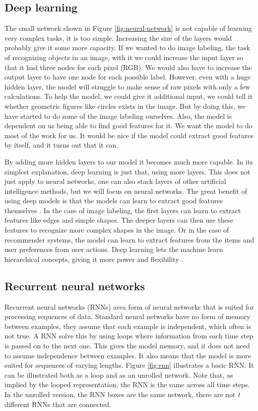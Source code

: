 \subsection{Deep learning}
The small network shown in Figure \ref{fig:neural-network} is not capable of learning very complex tasks, it is too simple.  Increasing the size of the layers would probably give it some more capacity. If we wanted to do image labeling, the task of recognizing objects in an image, with it we could increase the input layer so that it had three nodes for each pixel (RGB). We would also have to increase the output layer to have one node for each possible label. However, even with a huge hidden layer, the model will struggle to make sense of raw pixels with only a few calculations. To help the model, we could give it additional input, we could tell it whether geometric figures like circles exists in the image. But by doing this, we have started to do some of the image labeling ourselves. Also, the model is dependent on us being able to find good features for it. We want the model to do most of the work for us. It would be nice if the model could extract good features by itself, and it turns out that it can.

By adding more hidden layers to our model it becomes much more capable. In its simplest explanation, deep learning is just that, using more layers. This does not just apply to neural networks, one can also stack layers of other artificial intelligence methods, but we will focus on neural networks. The great benefit of using deep models is that the models can learn to extract good features themselves \cite{Goodfellow-et-al-2016-Book}. In the case of image labeling, the first layers can learn to extract features like edges and simple shapes. The deeper layers can then use these features to recognize more complex shapes in the image. Or in the case of recommender systems, the model can learn to extract features from the items and user preferences from user actions. Deep learning lets the machine learn hierarchical concepts, giving it more power and flexibility \cite{Goodfellow-et-al-2016-Book}.

\subsection{Recurrent neural networks}
Recurrent neural networks (RNNs) area form of neural networks that is suited for processing sequences of data. Standard neural networks have no form of memory between examples, they assume that each example is independent, which often is not true. A RNN solve this by using loops where information from each time step is passed on to the next one. This gives the model memory, and it does not need to assume independence between examples. It also means that the model is more suited for sequences of varying lengths. Figure \ref{fig:rnn} illustrates a basic RNN. It can be illustrated both as a loop and as an unrolled network. Note that, as implied by the looped representation, the RNN is the same across all time steps. In the unrolled version, the RNN boxes are the same network, there are not \textit{t} different RNNs that are connected.

